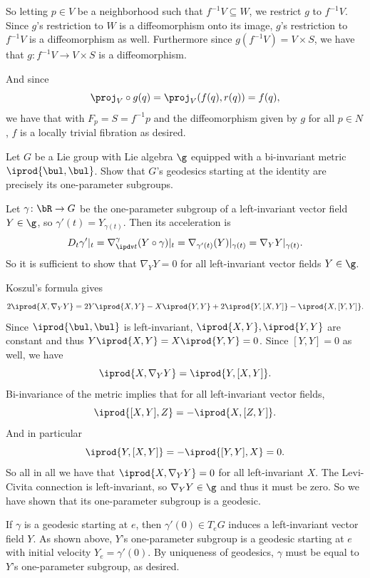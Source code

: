     So letting $p\in V$ be a neighborhood such that $f^{-1}V\subseteq W$, we restrict $g$ to $f^{-1}V$.
    Since $g$'s restriction to $W$ is a diffeomorphism onto its image, $g$'s restriction to $f^{-1}V$ is a diffeomorphism as well.
    Furthermore since $g(f^{-1}V)=V\times S$, we have that $g\colon f^{-1}V\to V\times S$ is a diffeomorphism.

    And since
    $$ \proj_V\circ g(q) = \proj_V(f(q),r(q)) = f(q), $$
    we have that with $F_p=S=f^{-1}p$ and the diffeomorphism given by $g$ for all $p\in N$, $f$ is a locally trivial fibration as desired.
\eenum

\bprob[title={DoCarmo, Riemannian Geometry page 80 question 3b}]

    Let $G$ be a Lie group with Lie algebra $\g$ equipped with a bi-invariant metric $\iprod{\bul,\bul}$.
    Show that $G$'s geodesics starting at the identity are precisely its one-parameter subgroups.

\eprob

Let $\gamma\colon\bR\to G$ be the one-parameter subgroup of a left-invariant vector field $Y\in\g$, so
$\gamma'(t)=Y_{\gamma(t)}$.
Then its acceleration is
$$ D_t\gamma'|_t = \nabla_{\ipdv t}^\gamma(Y\circ\gamma)|_t = \nabla_{\gamma'(t)}(Y)|_{\gamma(t)}
= \nabla_YY|_{\gamma(t)} . $$
So it is sufficient to show that $\nabla_YY=0$ for all left-invariant vector fields $Y\in\g$.

Koszul's formula gives
$$ 2\iprod{X,\nabla_YY} = 2Y\iprod{X,Y} - X\iprod{Y,Y} + 2\iprod{Y,[X,Y]} - \iprod{X,[Y,Y]} . $$
Since $\iprod{\bul,\bul}$ is left-invariant, $\iprod{X,Y},\iprod{Y,Y}$ are constant and thus $Y\iprod{X,Y}=X\iprod{Y,Y}=0$.
Since $[Y,Y]=0$ as well, we have
$$ \iprod{X,\nabla_YY} = \iprod{Y,[X,Y]} . $$
Bi-invariance of the metric implies that for all left-invariant vector fields,
$$ \iprod{[X,Y],Z} = -\iprod{X,[Z,Y]} . $$
And in particular
$$ \iprod{Y,[X,Y]} = -\iprod{[Y,Y],X} = 0 . $$
So all in all we have that $\iprod{X,\nabla_YY}=0$ for all left-invariant $X$.
The Levi-Civita connection is left-invariant, so $\nabla_YY\in\g$ and thus it must be zero.
So we have shown that its one-parameter subgroup is a geodesic.

If $\gamma$ is a geodesic starting at $e$, then $\gamma'(0)\in T_eG$ induces a left-invariant vector field $Y$.
As shown above, $Y$'s one-parameter subgroup is a geodesic starting at $e$ with initial velocity $Y_e=\gamma'(0)$.
By uniqueness of geodesics, $\gamma$ must be equal to $Y$'s one-parameter subgroup, as desired.


